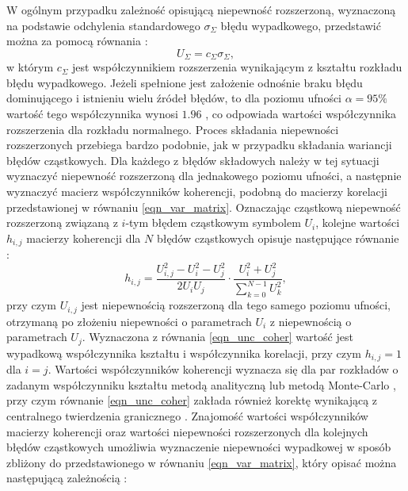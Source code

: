 W ogólnym przypadku zależność opisującą niepewność rozszerzoną, wyznaczoną na podstawie odchylenia standardowego $\sigma_{\Sigma}$ błędu wypadkowego, przedstawić można za pomocą równania \cite{jcgm_guide}:
\begin{equation}
U_{\Sigma} = c_{\Sigma} \sigma_{\Sigma} \label{eqn_unc_sum},
\end{equation}
w którym $c_{\Sigma}$ jest współczynnikiem rozszerzenia wynikającym z kształtu rozkładu błędu wypadkowego. Jeżeli spełnione jest założenie odnośnie braku błędu dominującego i istnieniu wielu źródeł błędów, to dla poziomu ufności $\alpha = 95\%$ wartość tego współczynnika wynosi $1.96$ \cite{jcgm_guide}, co odpowiada wartości współczynnika rozszerzenia dla rozkładu normalnego. Proces składania niepewności rozszerzonych przebiega bardzo podobnie, jak w przypadku składania wariancji błędów cząstkowych. Dla każdego z błędów składowych należy w tej sytuacji wyznaczyć niepewność rozszerzoną dla jednakowego poziomu ufności, a następnie wyznaczyć macierz współczynników koherencji, podobną do macierzy korelacji przedstawionej w równaniu \eqref{eqn_var_matrix}. Oznaczając cząstkową niepewność rozszerzoną związaną z $i$-tym błędem cząstkowym symbolem $U_{i}$, kolejne wartości $h_{i,j}$ macierzy koherencji dla $N$ błędów cząstkowych opisuje następujące równanie \cite{jakubiec_reductive}:
\begin{equation}
h_{i,j} = \frac{U_{i,j}^{2} - U_{i}^{2} - U_{j}^{2}}{2 U_{i} U_{j}} \cdot \frac{U_{i}^{2} + U_{j}^{2}}{\sum _{k = 0} ^{N-1} U_{k}^{2}} \label{eqn_unc_coher},
\end{equation}
przy czym $U_{i,j}$ jest niepewnością rozszerzoną dla tego samego poziomu ufności, otrzymaną po złożeniu niepewności o parametrach $U_{i}$ z niepewnością o parametrach $U_{j}$. Wyznaczona z równania \eqref{eqn_unc_coher} wartość jest wypadkową współczynnika kształtu i współczynnika korelacji, przy czym $h_{i,j} = 1$ dla $i = j$. Wartości współczynników koherencji wyznacza się dla par rozkładów o zadanym współczynniku kształtu metodą analityczną lub metodą Monte-Carlo \cite{jakubiec_arithmetic}, przy czym równanie \eqref{eqn_unc_coher} zakłada również korektę wynikającą z centralnego twierdzenia granicznego \cite{jakubiec_system}. Znajomość wartości współczynników macierzy koherencji oraz wartości niepewności rozszerzonych dla kolejnych błędów cząstkowych umożliwia wyznaczenie niepewności wypadkowej w sposób zbliżony do przedstawionego w równaniu \eqref{eqn_var_matrix}, który opisać można następującą zależnością \cite{jakubiec_reductive}:
